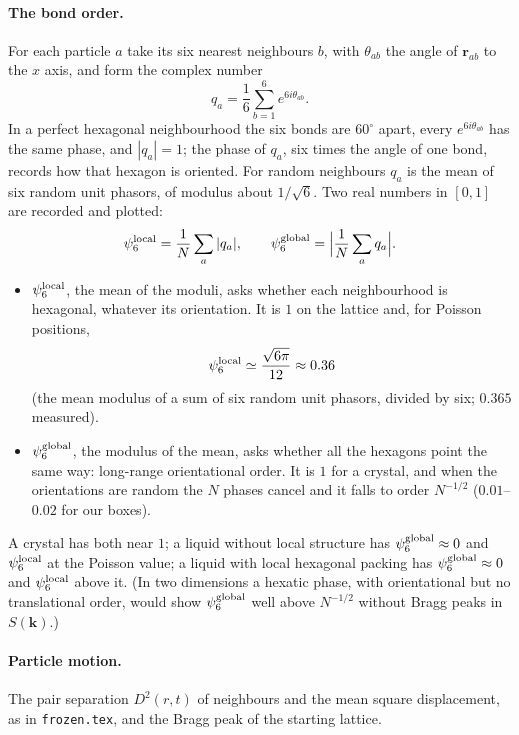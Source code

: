 \documentclass[11pt,aps,preprint,nofootinbib,superscriptaddress,tightenlines]{revtex4-2}
\def\st{\begin{equation}}
\def\stp{\end{equation}}
\let\oldparagraph\paragraph
\renewcommand{\paragraph}{\par\bigskip\oldparagraph}
\begin{document}
\paragraph{The bond order.}  For each particle $a$ take its six nearest neighbours $b$, with $\theta_{ab}$ the angle of $\bm r_{ab}$ to the $x$ axis,
and form the complex number
\st
q_a=\frac16\sum_{b=1}^6e^{6i\theta_{ab}} .
\stp
In a perfect hexagonal neighbourhood the six bonds are $60^\circ$ apart, every $e^{6i\theta_{ab}}$ has the same phase, and $|q_a|=1$;
the phase of $q_a$, six times the angle of one bond, records how that hexagon is oriented.  For random neighbours $q_a$ is the
mean of six random unit phasors, of modulus about $1/\sqrt6$.  Two real numbers in $[0,1]$ are recorded and plotted:
\st
\psi_6^{\rm local}=\frac1N\sum_a|q_a|,\qquad \psi_6^{\rm global}=\Big|\frac1N\sum_aq_a\Big| .
\stp
\begin{itemize}
\item $\psi_6^{\rm local}$, the mean of the moduli, asks whether each neighbourhood is hexagonal, whatever its orientation.  It
  is $1$ on the lattice and, for Poisson positions,
  \st
  \psi_6^{\rm local}\simeq\frac{\sqrt{6\pi}}{12}\approx0.36
  \stp
  (the mean modulus of a sum of six random unit phasors, divided by six; $0.365$ measured).
\item $\psi_6^{\rm global}$, the modulus of the mean, asks whether all the hexagons point the same way: long-range orientational
  order.  It is $1$ for a crystal, and when the orientations are random the $N$ phases cancel and it falls to order
  $N^{-1/2}$ ($0.01$--$0.02$ for our boxes).
\end{itemize}
A crystal has both near $1$; a liquid without local structure has $\psi_6^{\rm global}\approx0$ and $\psi_6^{\rm local}$ at the Poisson
value; a liquid with local hexagonal packing has $\psi_6^{\rm global}\approx0$ and $\psi_6^{\rm local}$ above it.  (In two dimensions a hexatic
phase, with orientational but no translational order, would show $\psi_6^{\rm global}$ well above $N^{-1/2}$ without Bragg peaks in
$S(\bm k)$.)

\paragraph{Particle motion.}  The pair separation $D^2(r,t)$ of neighbours and the mean square displacement, as in
\texttt{frozen.tex}, and the Bragg peak of the starting lattice.

\end{document}
